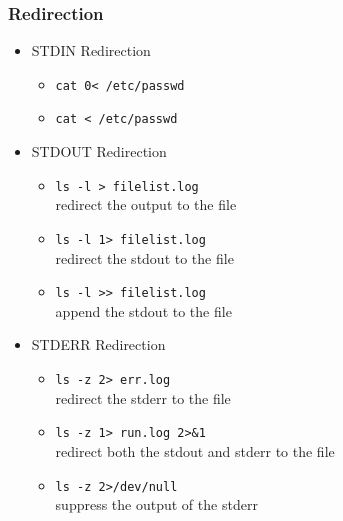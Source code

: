 \documentclass[red]{beamer}
\begin{document}
\begin{CJK*}{UTF8}{gbsn}
\begin{frame}[containsverbatim]
\frametitle{Redirection}
\begin{itemize}
	\item STDIN Redirection
	\begin{itemize}
		\item \lstinline{cat 0< /etc/passwd}
		\item \lstinline{cat < /etc/passwd}
	\end{itemize}
	\item STDOUT Redirection
	\begin{itemize}
		\item \lstinline{ls -l > filelist.log}\\redirect the output to the file
		\item \lstinline{ls -l 1> filelist.log}\\redirect the stdout to the file
		\item \lstinline{ls -l >> filelist.log}\\append the stdout to the file
	\end{itemize}
	\item STDERR Redirection
	\begin{itemize}
		\item \lstinline{ls -z 2> err.log}\\redirect the stderr to the file
		\item \lstinline{ls -z 1> run.log 2>&1}\\redirect both the stdout and stderr to the file
		\item \lstinline{ls -z 2>/dev/null}\\suppress the output of the stderr
	\end{itemize}
\end{itemize}
\end{frame}



\end{CJK*}
\end{document}
